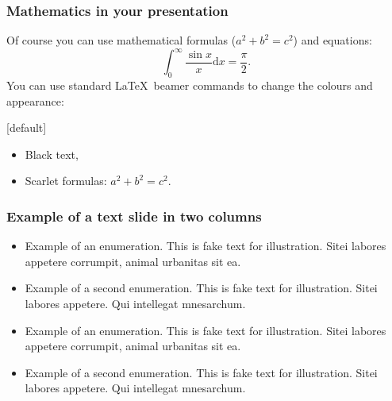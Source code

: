 \documentclass[t,aspectratio=169]{beamer}
\begin{document}

\begin{frame}
  \frametitle{Mathematics in your presentation}
  
  Of course you can use mathematical formulas ($a^2+b^2=c^2$) and equations:
  \begin{equation}
    \int_0^\infty \frac{\sin x}{x} \text{d}x=\frac{\pi}{2}.
  \end{equation}
  You can use standard \LaTeX\ beamer commands to change the colours and appearance:
  
  [default]         %
  
  \begin{itemize}
    \item Black text,
    \item Scarlet formulas: $a^2+b^2=c^2$.
  \end{itemize}
\end{frame}


\title{} %
\begin{frame}
  \frametitle{Example of a text slide in two columns}
  
  \begin{multicols}{2}
    \begin{itemize}
      \item Example of an enumeration. This is fake text for illustration. Sitei labores appetere corrumpit, animal urbanitas sit ea.
      \item Example of a second enumeration. This is fake text for illustration. Sitei labores appetere. Qui intellegat mnesarchum.
      \item Example of an enumeration. This is fake text for illustration. Sitei labores appetere corrumpit, animal urbanitas sit ea.
      \item Example of a second enumeration. This is fake text for illustration. Sitei labores appetere. Qui intellegat mnesarchum.
    \end{itemize}
  \end{multicols}
\end{frame}
\end{document}
